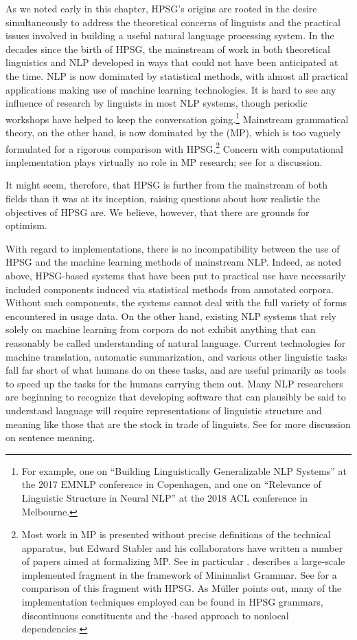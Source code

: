 \documentclass[output=paper
 	        ,biblatex
                ,babelshorthands
                ,newtxmath
                ,draftmode
                ,colorlinks, citecolor=brown
]{langscibook}
\begin{document}
As we noted early in this chapter, HPSG's origins are rooted in the desire simultaneously to address
the theoretical concerns of linguists and the practical issues involved in building a useful natural
language processing system.  In the decades since the birth of HPSG, the mainstream of work in both
theoretical linguistics and NLP developed in ways that could not have been anticipated at the time.
NLP is now dominated by statistical methods, with almost all practical applications making use of
machine learning technologies.  It is hard to see any influence of research by linguists in most NLP
systems, though periodic workshops have helped to keep the conversation going.\footnote{For example,
  one on ``Building Linguistically Generalizable NLP Systems'' at the 2017 EMNLP conference in
  Copenhagen, and one on ``Relevance of Linguistic Structure in Neural NLP'' at the 2018 ACL
  conference in Melbourne.}  Mainstream grammatical theory, on the other hand, is now dominated by
the  (MP), which is too vaguely formulated for a rigorous comparison with
HPSG.\footnote{Most work in MP is presented without precise definitions of the technical apparatus,
  but Edward Stabler and his collaborators have written a number of papers aimed at formalizing
  MP. See in particular \citet{CollStab2016}. \citet{Torr2019a-u} describes a large-scale
  implemented fragment in the framework of Minimalist Grammar. See 
  for a comparison of this fragment with HPSG. As Müller points out, many of the implementation
  techniques employed can be found in HPSG grammars, \eg discontinuous constituents and the
  \slasch-based approach to nonlocal dependencies.}   Concern with computational implementation
plays virtually no role in MP research; see \citet{MuellerGT-Eng1} for a discussion. 

It might seem, therefore, that HPSG is further from the mainstream of both fields than it was at its inception, raising questions about how realistic the objectives of HPSG are.  We believe, however, that there are grounds for optimism.

With regard to implementations, there is no incompatibility between the use of HPSG and the machine learning methods of mainstream NLP.  Indeed, as noted above, HPSG-based systems that have been put to practical use have necessarily included components induced via statistical methods from annotated corpora.  Without such components, the systems cannot deal with the full variety of forms encountered in usage data.  On the other hand, existing NLP systems that rely solely on machine learning from corpora do not exhibit anything that can reasonably be called understanding of natural language.  Current technologies for machine translation, automatic summarization, and various other linguistic tasks fall far short of what humans do on these tasks, and are useful primarily as tools to speed up the tasks for the humans carrying them out.  Many NLP researchers are beginning to recognize that developing software that can plausibly be said to understand language will require representations of linguistic structure and meaning like those that are the stock in trade of linguists.  See \citet*{Bender2015LayersOI} for more discussion on sentence meaning.
\end{document}
